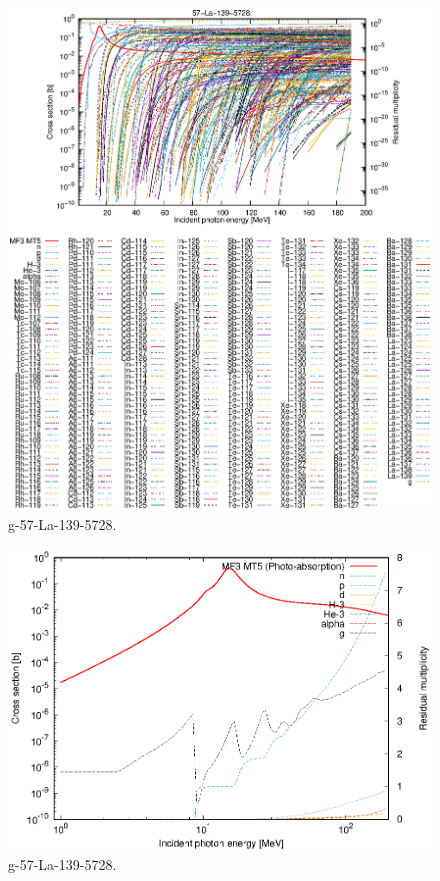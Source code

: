 \begin{figure}
 \includegraphics[width=\linewidth]{eps/g_57-La-139_5728.eps}
  \caption{g-57-La-139-5728.}
\end{figure}
\newpage \clearpage

\begin{figure}
 \includegraphics[width=\linewidth]{eps-log/g_57-La-139_5728.eps}
 \caption{g-57-La-139-5728.}
\end{figure}
\newpage \clearpage

